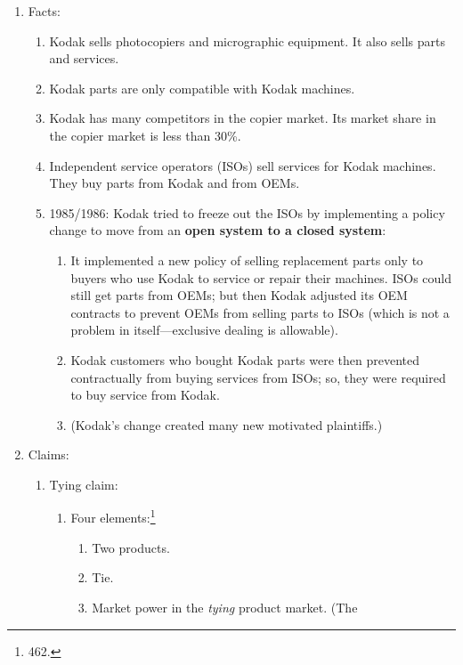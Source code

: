 \begin{enumerate}
    \item Facts:
    \begin{enumerate}
        \item Kodak sells photocopiers and micrographic equipment. It also 
        sells parts and services.
        \item Kodak parts are only compatible with Kodak machines.
        \item Kodak has many competitors in the copier market. Its market 
        share in the copier market is less than 30\%.
        \item Independent service operators (ISOs) sell services for Kodak 
        machines. They buy parts from Kodak and from OEMs.
        \item 1985/1986: Kodak tried to freeze out the ISOs by implementing a 
        policy change to move from an \textbf{open system to a closed system}:
        \begin{enumerate}
            \item It implemented a new policy of selling replacement parts 
            only to buyers who use Kodak to service or repair their machines. 
            ISOs could still get parts from OEMs; but then Kodak adjusted its 
            OEM contracts to prevent OEMs from selling parts to ISOs (which is 
            not a problem in itself---exclusive dealing is allowable).  
            \item Kodak customers who bought Kodak parts were then prevented 
            contractually from buying services from ISOs; so, they were 
            required to buy service from Kodak.
            \item (Kodak's change created many new motivated plaintiffs.)
        \end{enumerate}
    \end{enumerate}
    \item Claims:
    \begin{enumerate}
        \item Tying claim:
        \begin{enumerate}
            \item Four elements:\footnote{462.}
            \begin{enumerate}
                \item Two products.
                \item Tie.
                \item Market power in the \emph{tying} product market. (The 

\end{enumerate}
\end{enumerate}
\end{enumerate}
\end{enumerate}
